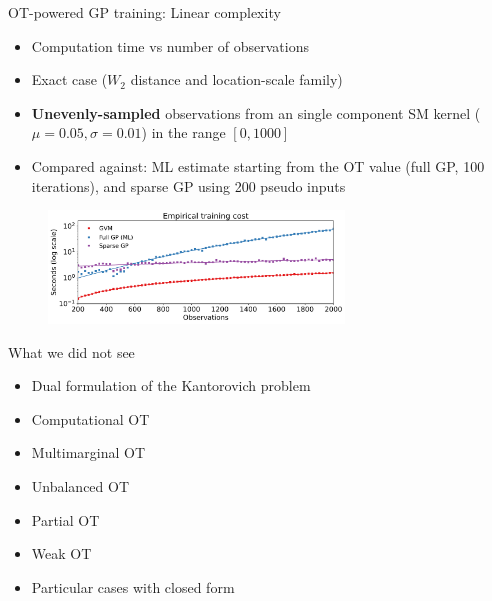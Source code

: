 \documentclass[pdf,aspectratio=169,10pt]{beamer}
\begin{document}
\begin{frame}[plain]{OT-powered GP training: Linear complexity }

\begin{itemize}
    \item Computation time vs number of observations
    \item Exact case ($W_2$ distance and location-scale family)
    \item \textbf{Unevenly-sampled} observations from an single component SM kernel ($\mu=0.05, \sigma=0.01$) in the range $[0,1000]$
    \item Compared against: ML estimate starting from the OT value (full GP, 100 iterations), and sparse GP using 200 pseudo inputs
\end{itemize}

\begin{figure}[ht]
\centering
  \includegraphics[width=0.7\textwidth]{../img/exp2.pdf}
  \label{fig:comp_cost}
\end{figure} 
    
\end{frame}







\begin{frame}{What we did not see}
\begin{itemize}
    \item Dual formulation of the Kantorovich problem
    \item Computational OT
    \item Multimarginal OT
    \item Unbalanced OT
    \item Partial OT
    \item Weak OT
    \item Particular cases with closed form
\end{itemize}
\end{frame}
\end{document}
